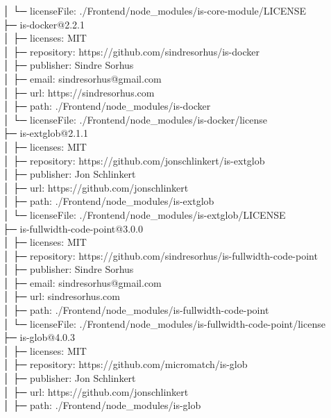 \documentclass[
    paper=a4,
    twoside=false,
    parskip=half,
    listof=entryprefix,
    listof=totoc,
    index=totoc,
    bibliography=totoc,
    headsepline,
]{scrbook}
\begin{document}
    │  └─ licenseFile: ./Frontend/node\_modules/is-core-module/LICENSE\\
    ├─ is-docker@2.2.1\\
    │  ├─ licenses: MIT\\
    │  ├─ repository: https://github.com/sindresorhus/is-docker\\
    │  ├─ publisher: Sindre Sorhus\\
    │  ├─ email: sindresorhus@gmail.com\\
    │  ├─ url: https://sindresorhus.com\\
    │  ├─ path: ./Frontend/node\_modules/is-docker\\
    │  └─ licenseFile: ./Frontend/node\_modules/is-docker/license\\
    ├─ is-extglob@2.1.1\\
    │  ├─ licenses: MIT\\
    │  ├─ repository: https://github.com/jonschlinkert/is-extglob\\
    │  ├─ publisher: Jon Schlinkert\\
    │  ├─ url: https://github.com/jonschlinkert\\
    │  ├─ path: ./Frontend/node\_modules/is-extglob\\
    │  └─ licenseFile: ./Frontend/node\_modules/is-extglob/LICENSE\\
    ├─ is-fullwidth-code-point@3.0.0\\
    │  ├─ licenses: MIT\\
    │  ├─ repository: https://github.com/sindresorhus/is-fullwidth-code-point\\
    │  ├─ publisher: Sindre Sorhus\\
    │  ├─ email: sindresorhus@gmail.com\\
    │  ├─ url: sindresorhus.com\\
    │  ├─ path: ./Frontend/node\_modules/is-fullwidth-code-point\\
    │  └─ licenseFile: ./Frontend/node\_modules/is-fullwidth-code-point/license\\
    ├─ is-glob@4.0.3\\
    │  ├─ licenses: MIT\\
    │  ├─ repository: https://github.com/micromatch/is-glob\\
    │  ├─ publisher: Jon Schlinkert\\
    │  ├─ url: https://github.com/jonschlinkert\\
    │  ├─ path: ./Frontend/node\_modules/is-glob\\
\end{document}
